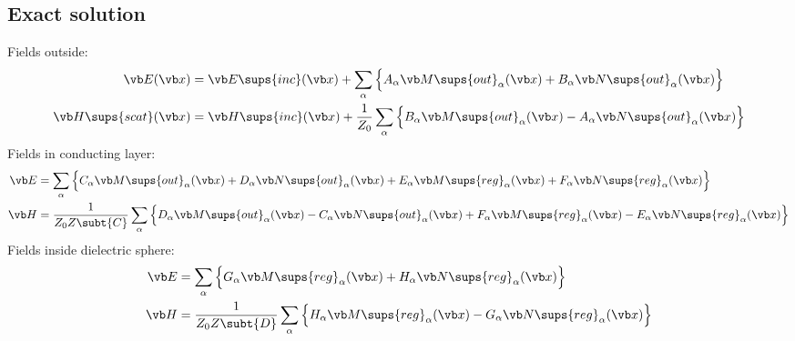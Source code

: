 \documentclass{article}
\begin{document}
\subsection{Exact solution}
\label{SphereExactSolution}

Fields outside:
\begin{subequations}
\begin{align}
 \vb E(\vb x) &= \vb E\sups{inc}(\vb x) 
+ \sum_{\alpha}
     \Big\{ A_\alpha\vb M\sups{out}_\alpha(\vb x)
           +B_\alpha\vb N\sups{out}_\alpha(\vb x)
     \Big\}
\\
\vb H\sups{scat}(\vb x) &= \vb H\sups{inc}(\vb x)
+ \frac{1}{Z_0}
     \sum_{\alpha}
     \Big\{ B_\alpha\vb M\sups{out}_\alpha(\vb x)
           -A_\alpha\vb N\sups{out}_\alpha(\vb x)
     \Big\}
\\
\end{align}
\label{SphereFieldsOutside}
\end{subequations}
Fields in conducting layer:
\begin{align}
\vb E &= 
   \sum_{\alpha}
     \Big\{ C_\alpha\vb M\sups{out}_\alpha(\vb x)
           +D_\alpha\vb N\sups{out}_\alpha(\vb x)
           +E_\alpha\vb M\sups{reg}_\alpha(\vb x)
           +F_\alpha\vb N\sups{reg}_\alpha(\vb x)
     \Big\}
\\
\vb H &= 
 \frac{1}{Z_0Z\subt{C}}
   \sum_{\alpha}
     \Big\{ D_\alpha\vb M\sups{out}_\alpha(\vb x)
           -C_\alpha\vb N\sups{out}_\alpha(\vb x)
           +F_\alpha\vb M\sups{reg}_\alpha(\vb x)
           -E_\alpha\vb N\sups{reg}_\alpha(\vb x)
     \Big\}
\end{align}
Fields inside dielectric sphere:
\begin{subequations}
\begin{align}
\vb E &= 
   \sum_{\alpha}
     \Big\{ G_\alpha\vb M\sups{reg}_\alpha(\vb x)
           +H_\alpha\vb N\sups{reg}_\alpha(\vb x)
     \Big\}
\\
\vb H &= 
 \frac{1}{Z_0Z\subt{D}}
   \sum_{\alpha}
     \Big\{ H_\alpha\vb M\sups{reg}_\alpha(\vb x)
           -G_\alpha\vb N\sups{reg}_\alpha(\vb x)
     \Big\}
\end{align}
\label{SphereFieldsInside}
\end{subequations}
\end{document}
